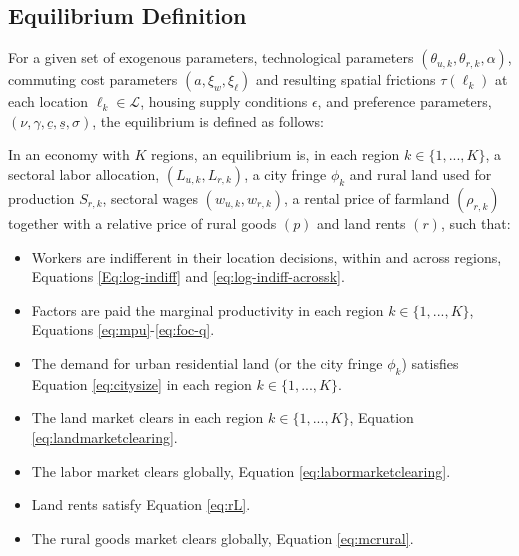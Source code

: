 \documentclass[20250130-paper.tex]{subfiles}
\begin{document}
\subsection{Equilibrium Definition} \label{subsec:Eqdef}

For a given set of exogenous parameters, technological parameters $(\theta_{u,k},\theta_{r,k}, \alpha)$, commuting cost parameters $(a, \xi_w, \xi_\ell)$ and resulting spatial frictions $\tau(\ell_k)$ at each location $\ell_k \in \mathcal{L}$, housing supply conditions $\epsilon$,  and preference parameters, $(\nu,\gamma, \underline{c},\underline{s}, \sigma)$, the equilibrium is defined as follows:
\begin{definition}
	In an economy with $K$ regions, an equilibrium is, in each region $k \in \{1, ..., K\}$, a sectoral labor allocation, $(L_{u,k},L_{r,k})$, a city fringe $\phi_k$ and rural land used for production $S_{r,k}$, sectoral wages $(w_{u,k},w_{r,k})$, a rental price of farmland $(\rho_{r,k})$ together with a relative price of rural goods $(p)$ and land rents $(r)$, such that:
	\begin{itemize}
		\item Workers are indifferent in their location decisions, within and across regions, Equations \eqref{Eq:log-indiff} and \eqref{eq:log-indiff-acrossk}.
		\item Factors are paid the marginal productivity in each region $k \in \{1, ..., K\}$, Equations \eqref{eq:mpu}-\eqref{eq:foc-q}.
		\item The demand for urban residential land (or the city fringe $\phi_k$) satisfies Equation \eqref{eq:citysize} in each region $k \in \{1, ..., K\}$.
		\item The land market clears in each region $k \in \{1, ..., K\}$, Equation \eqref{eq:landmarketclearing}. 
		\item The labor market clears globally, Equation \eqref{eq:labormarketclearing}.
		\item Land rents satisfy Equation \eqref{eq:rL}.
		\item The rural goods market clears globally, Equation \eqref{eq:mcrural}.
	\end{itemize}
\end{definition}
\end{document}
